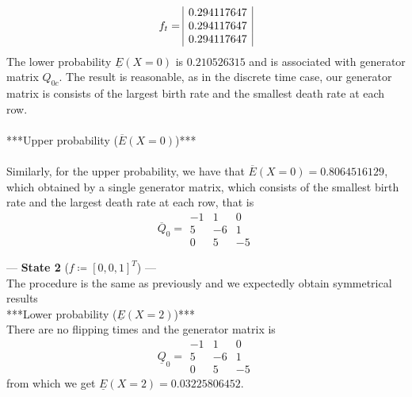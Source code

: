 \documentclass{article}
\begin{document}
\begin{equation*} 
 f_{t}= 
 \begin{array}{|r|}
  0.294117647\\
  0.294117647\\
  0.294117647
 \end{array}\\\\
 \end{equation*} 
The lower probability $\underline{E}(X=0)$ is $0.210526315$ and is associated with generator matrix $Q_{0c}$.
The result is reasonable, as in the discrete time case, our generator matrix is consists of the largest birth rate and the smallest death rate at each row.\\\\

***Upper probability ($\overline{E}(X=0)$)***\\\\
Similarly, for the upper probability, we have that $\overline{E}(X=0)= 0.8064516129$, which obtained by a single generator matrix, which consists of the smallest birth rate and the largest death rate at each row, that is
\begin{equation*} 
 \overline{Q}_{0}= 
 \begin{array}{|rrr|}
  -1 & 1 & 0 \\
  5 & -6 & 1 \\
  0 & 5 & -5  
 \end{array}
\end{equation*}

--- \textbf{State 2} ($f\coloneqq[0,0,1]^T$) ---\\

The procedure is the same as previously and we expectedly obtain symmetrical results\\

***Lower probability ($\underline{E}(X=2)$)***\\

There are no flipping times and the generator matrix is 
\begin{equation*} 
 \underline{Q}_{0}= 
 \begin{array}{|rrr|}
  -1 & 1 & 0 \\
  5 & -6 & 1 \\
  0 & 5 & -5  
 \end{array}
\end{equation*}
from which we get $\underline{E}(X=2)=0.03225806452$.\\\\
\end{document}
